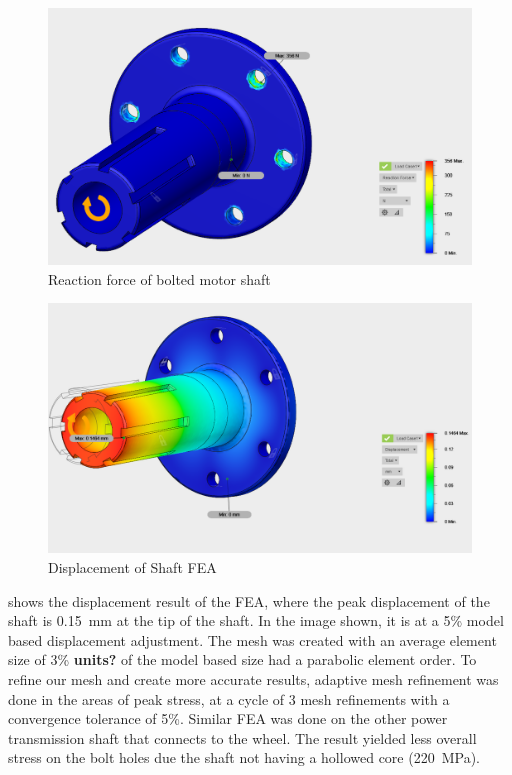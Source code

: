 \documentclass[main.tex]{subfiles}
\begin{document}
    \begin{figure}
        \centering
        \includegraphics[width=\linewidth]{images/fig13}
        \caption{Reaction force of bolted motor shaft}
    \end{figure}
    \begin{figure}[H]
        \centering
        \includegraphics[width=\linewidth]{images/fig14}
        \caption{Displacement of Shaft FEA}
        \label{fig:shaft-stress1}
    \end{figure}

 shows the displacement result of the FEA, where the peak displacement of the shaft is \SI{0.15}{mm} at the tip of the shaft. In the image shown, it is at a 5\% model based displacement adjustment. %
The mesh was created with an average element size of 3\% \textbf{units?} of the model based size had a parabolic element order. To refine our mesh and create more accurate results, adaptive mesh refinement was done in the areas of peak stress, at a cycle of 3 mesh refinements with a convergence tolerance of 5\%. Similar FEA was done on the other power transmission shaft that connects to the wheel. The result yielded less overall stress on the bolt holes due the shaft not having a hollowed core (\SI{220}{MPa}).\\
\end{document}
